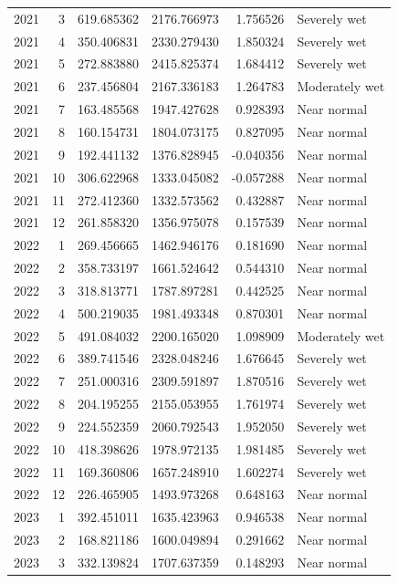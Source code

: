 \begin{tabular}{rrrrrl}
2021 & 3 & 619.685362 & 2176.766973 & 1.756526 & Severely wet \\
2021 & 4 & 350.406831 & 2330.279430 & 1.850324 & Severely wet \\
2021 & 5 & 272.883880 & 2415.825374 & 1.684412 & Severely wet \\
2021 & 6 & 237.456804 & 2167.336183 & 1.264783 & Moderately wet \\
2021 & 7 & 163.485568 & 1947.427628 & 0.928393 & Near normal \\
2021 & 8 & 160.154731 & 1804.073175 & 0.827095 & Near normal \\
2021 & 9 & 192.441132 & 1376.828945 & -0.040356 & Near normal \\
2021 & 10 & 306.622968 & 1333.045082 & -0.057288 & Near normal \\
2021 & 11 & 272.412360 & 1332.573562 & 0.432887 & Near normal \\
2021 & 12 & 261.858320 & 1356.975078 & 0.157539 & Near normal \\
2022 & 1 & 269.456665 & 1462.946176 & 0.181690 & Near normal \\
2022 & 2 & 358.733197 & 1661.524642 & 0.544310 & Near normal \\
2022 & 3 & 318.813771 & 1787.897281 & 0.442525 & Near normal \\
2022 & 4 & 500.219035 & 1981.493348 & 0.870301 & Near normal \\
2022 & 5 & 491.084032 & 2200.165020 & 1.098909 & Moderately wet \\
2022 & 6 & 389.741546 & 2328.048246 & 1.676645 & Severely wet \\
2022 & 7 & 251.000316 & 2309.591897 & 1.870516 & Severely wet \\
2022 & 8 & 204.195255 & 2155.053955 & 1.761974 & Severely wet \\
2022 & 9 & 224.552359 & 2060.792543 & 1.952050 & Severely wet \\
2022 & 10 & 418.398626 & 1978.972135 & 1.981485 & Severely wet \\
2022 & 11 & 169.360806 & 1657.248910 & 1.602274 & Severely wet \\
2022 & 12 & 226.465905 & 1493.973268 & 0.648163 & Near normal \\
2023 & 1 & 392.451011 & 1635.423963 & 0.946538 & Near normal \\
2023 & 2 & 168.821186 & 1600.049894 & 0.291662 & Near normal \\
2023 & 3 & 332.139824 & 1707.637359 & 0.148293 & Near normal \\

\end{tabular}
